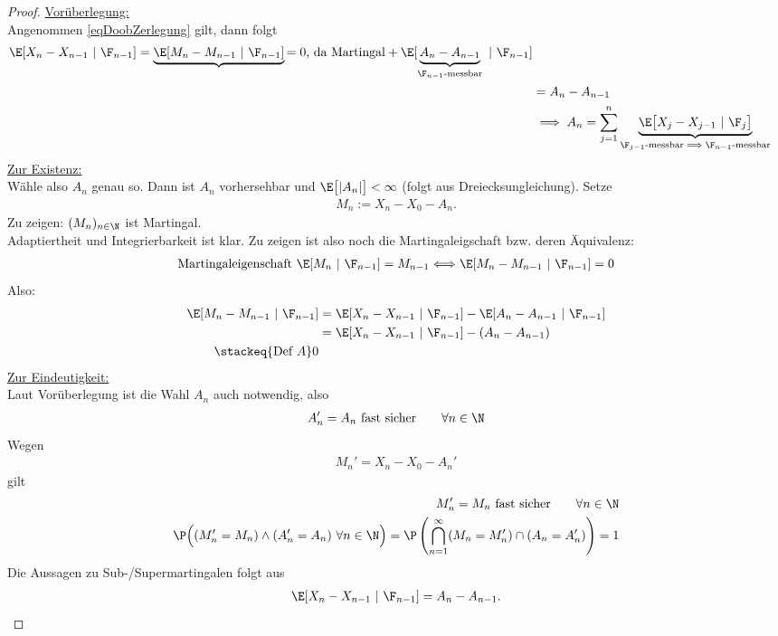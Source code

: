 \begin{proof}
\underline{Vorüberlegung:}\\
Angenommen \eqref{eqDoobZerlegung} gilt, dann folgt
\begin{align*}
\E[X_n-X_{n-1}~|~\F_{n-1}]
=\underbrace{\E[M_n-M_{n-1}~|~\F_{n-1}]}{=0\text{, da Martingal}}
+\E[\underbrace{A_n-A_{n-1}}_{\F_{n-1}\text{-messbar}}~|~\F_{n-1}]\\
&=A_n-A_{n-1}\\
&\implies
A_n=\sum\limits_{j=1}^n\underbrace{\E\big[X_j-X_{j-1}~|~\F_j\big]}_{\F_{j-1}\text{-messbar}\implies\F_{n-1}\text{-messbar}}
\end{align*}
\underline{Zur Existenz:}\\
Wähle also $A_n$ genau so. Dann ist $A_n$ vorhersehbar und $\E\big[|A_n|\big]<\infty$ (folgt aus Dreiecksungleichung). Setze
\begin{align*}
M_n:=X_n-X_0-A_n.
\end{align*}
Zu zeigen: $(M_n)_{n\in\N}$ ist Martingal.\\
Adaptiertheit und Integrierbarkeit ist klar. Zu zeigen ist also noch die Martingaleigschaft bzw. deren Äquivalenz:
\begin{align*}
\text{Martingaleigenschaft }\E[M_n~|~\F_{n-1}]=M_{n-1}\Longleftrightarrow
\E[M_n-M_{n-1}~|~\F_{n-1}]=0
\end{align*}
Also:
\begin{align*}
\E[M_{n}-M_{n-1}~|~\F_{n-1}]
&=\E[ X_n-X_{n-1}~|~\F_{n-1}]
-\E[A_n-A_{n-1}~|~\F_{n-1}]\\
&=\E[ X_n-X_{n-1}~|~\F_{n-1}]
-(A_n-A_{n-1})\\
\stackeq{\text{Def }A}
0
\end{align*}
\underline{Zur Eindeutigkeit:}\\
Laut Vorüberlegung ist die Wahl $A_n$ auch notwendig, also 
\begin{align*}
A_n'=A_n\text{ fast sicher}\qquad\forall n\in\N
\end{align*}
Wegen
\begin{align*}
M_n'=X_n-X_0-A_n'
\end{align*}
gilt
\begin{align*}
M_n'=M_n\text{ fast sicher}\qquad\forall n\in\N\\
\P\Big((M_n'=M_n)\wedge(A_n'=A_n)~\forall n\in\N\Big)
=\P\left(\bigcap\limits_{n=1}^\infty(M_n=M_n')\cap(A_n=A_n')\right)
=1
\end{align*}
Die Aussagen zu Sub-/Supermartingalen folgt aus
\begin{align*}
\E[X_n-X_{n-1}~|~\F_{n-1}]=A_n-A_{n-1}.
\end{align*}
\end{proof}